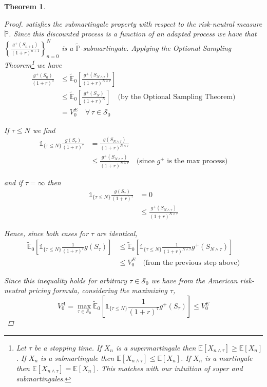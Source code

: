 \documentclass[12pt]{article}
\newtheorem{theorem}{Theorem}
\newlength\tindent
\renewcommand{\indent}{\hspace*{\tindent}}
\renewcommand{\P}{\mathbb P}
\newcommand{\E}{\mathbb E}
\begin{document}
\begin{theorem}
\begin{proof}
satisfies the submartingale property with respect to the risk-neutral measure $\tilde{\P}$. Since this discounted process is a function of an adapted process we have that $\left\{  \frac{ g^+ \left( S_{n + 1} \right) }{(1 + r)^{n + 1}} \right\}^N_{n = 0}$ is a $\tilde{\P}$-submartingale. Applying the Optional Sampling Theorem\footnote{Let $\tau$ be a stopping time. If $X_n$ is a supermartingale then $\E[X_{n\land\tau}] \geq \E[X_n]$. If $X_n$ is a submartingale then $\E[X_{n\land\tau}] \leq \E[X_n]$. If $X_n$ is a martingale then $\E[X_{n\land\tau}] = \E[X_n]$. This matches with our intuition of super and submartingales.} we have
\begin{align*}
	\frac{ g^+(S_0) }{(1 + r)^0} &\leq \tilde{\E}_0 \left[ \frac{ g^+ \left( S_{N\land\tau} \right) }{(1 + r)^{N\land\tau}} \right] \\
	&\leq \tilde{\E}_0 \left[ \frac{ g^+ \left( S_N \right) }{(1 + r)^N} \right] \quad \text{(by the Optional Sampling Theorem)} \\
	&= V^E_0 \quad \forall\,\tau \in \mathcal S_0 
\end{align*}

If $\tau \leq N$ we find
\begin{align*}
	\mathds 1_{\{\tau\leq N\}} \frac{g(S_\tau)}{(1 + r)^\tau} &= \frac{ g(S_{N\land\tau}) }{(1 + r)^{N\land\tau}} \\
	&\leq \frac{ g^+(S_{N\land\tau}) }{(1 + r)^{N\land\tau}} \quad \text{(since $g^+$ is the max process)}
\end{align*}

and if $\tau = \infty$ then
\begin{align*}
	\mathds 1_{\{\tau \leq N\}} \frac{g(S_\tau)}{(1 + r)^\tau} &= 0\\
	&\leq  \frac{ g^+(S_{N\land\tau}) }{(1 + r)^{N\land\tau}}
\end{align*}

Hence, since both cases for $\tau$ are identical,
\begin{align*}
	\tilde{\E}_0 \left[ \mathds 1_{\{\tau \leq N\}} \frac{1}{(1 + r)^\tau} g(S_\tau) \right] &\leq \tilde{\E}_0 \left[ \mathds 1_{\{\tau \leq N\}} \frac{1}{(1 + r)^{N\land\tau}} g^+(S_{N\land\tau}) \right] \\
	&\leq V^E_0 \quad \text{(from the previous step above)}
\end{align*}

\indent Since this inequality holds for arbitrary $\tau\in\mathcal S_0$ we have from the American risk-neutral pricing formula, considering the maximizing $\tau$,
\begin{equation*}
	V^A_0 = \max_{\tau\in\mathcal S_0} \tilde{\E}_0 \left[ \mathds 1_{\{\tau \leq N\}} \frac{1}{(1 + r)^{\tau}} g^+(S_\tau) \right] \leq V^E_0
\end{equation*}


\end{proof}
\end{theorem}
\end{document}
